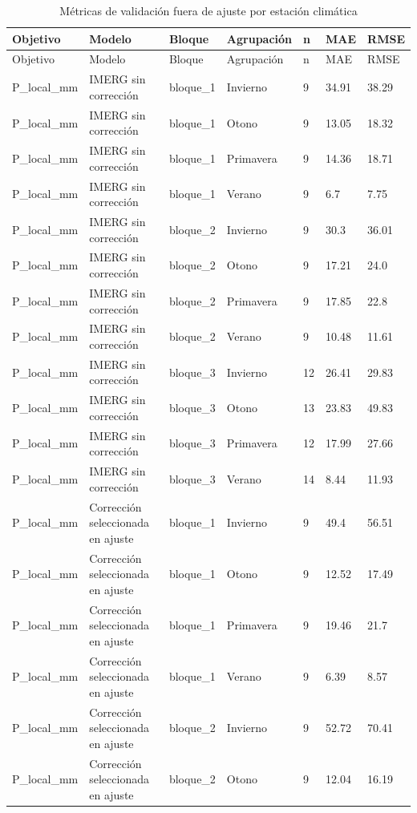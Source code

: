 \begin{longtable}{lllllll}
\caption{Métricas de validación fuera de ajuste por estación climática}\\
\toprule
Objetivo & Modelo & Bloque & Agrupación & n & MAE & RMSE \\
\midrule
\endfirsthead
\toprule
Objetivo & Modelo & Bloque & Agrupación & n & MAE & RMSE \\
\midrule
\endhead
\bottomrule
\endfoot
P\_local\_mm & IMERG sin corrección & bloque\_1 & Invierno & 9 & 34.91 & 38.29 \\
P\_local\_mm & IMERG sin corrección & bloque\_1 & Otono & 9 & 13.05 & 18.32 \\
P\_local\_mm & IMERG sin corrección & bloque\_1 & Primavera & 9 & 14.36 & 18.71 \\
P\_local\_mm & IMERG sin corrección & bloque\_1 & Verano & 9 & 6.7 & 7.75 \\
P\_local\_mm & IMERG sin corrección & bloque\_2 & Invierno & 9 & 30.3 & 36.01 \\
P\_local\_mm & IMERG sin corrección & bloque\_2 & Otono & 9 & 17.21 & 24.0 \\
P\_local\_mm & IMERG sin corrección & bloque\_2 & Primavera & 9 & 17.85 & 22.8 \\
P\_local\_mm & IMERG sin corrección & bloque\_2 & Verano & 9 & 10.48 & 11.61 \\
P\_local\_mm & IMERG sin corrección & bloque\_3 & Invierno & 12 & 26.41 & 29.83 \\
P\_local\_mm & IMERG sin corrección & bloque\_3 & Otono & 13 & 23.83 & 49.83 \\
P\_local\_mm & IMERG sin corrección & bloque\_3 & Primavera & 12 & 17.99 & 27.66 \\
P\_local\_mm & IMERG sin corrección & bloque\_3 & Verano & 14 & 8.44 & 11.93 \\
P\_local\_mm & Corrección seleccionada en ajuste & bloque\_1 & Invierno & 9 & 49.4 & 56.51 \\
P\_local\_mm & Corrección seleccionada en ajuste & bloque\_1 & Otono & 9 & 12.52 & 17.49 \\
P\_local\_mm & Corrección seleccionada en ajuste & bloque\_1 & Primavera & 9 & 19.46 & 21.7 \\
P\_local\_mm & Corrección seleccionada en ajuste & bloque\_1 & Verano & 9 & 6.39 & 8.57 \\
P\_local\_mm & Corrección seleccionada en ajuste & bloque\_2 & Invierno & 9 & 52.72 & 70.41 \\
P\_local\_mm & Corrección seleccionada en ajuste & bloque\_2 & Otono & 9 & 12.04 & 16.19 \\

\end{longtable}
